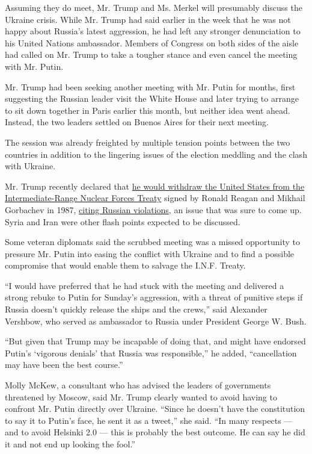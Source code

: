 Assuming they do meet, Mr. Trump and Ms. Merkel will presumably discuss
the Ukraine crisis. While Mr. Trump had said earlier in the week that he
was not happy about Russia's latest aggression, he had left any stronger
denunciation to his United Nations ambassador. Members of Congress on
both sides of the aisle had called on Mr. Trump to take a tougher stance
and even cancel the meeting with Mr. Putin.

Mr. Trump had been seeking another meeting with Mr. Putin for months,
first suggesting the Russian leader visit the White House and later
trying to arrange to sit down together in Paris earlier this month, but
neither idea went ahead. Instead, the two leaders settled on Buenos
Aires for their next meeting.

The session was already freighted by multiple tension points between the
two countries in addition to the lingering issues of the election
meddling and the clash with Ukraine.

Mr. Trump recently declared that
\href{https://www.nytimes3xbfgragh.onion/2018/10/19/us/politics/russia-nuclear-arms-treaty-trump-administration.html}{he
would withdraw the United States from the Intermediate-Range Nuclear
Forces Treaty} signed by Ronald Reagan and Mikhail Gorbachev in 1987,
\href{https://www.nytimes3xbfgragh.onion/2018/10/23/world/europe/inf-treaty-russia-united-states-trump-nuclear.html}{citing
Russian violations}, an issue that was sure to come up. Syria and Iran
were other flash points expected to be discussed.

Some veteran diplomats said the scrubbed meeting was a missed
opportunity to pressure Mr. Putin into easing the conflict with Ukraine
and to find a possible compromise that would enable them to salvage the
I.N.F. Treaty.

``I would have preferred that he had stuck with the meeting and
delivered a strong rebuke to Putin for Sunday's aggression, with a
threat of punitive steps if Russia doesn't quickly release the ships and
the crews,'' said Alexander Vershbow, who served as ambassador to Russia
under President George W. Bush.

``But given that Trump may be incapable of doing that, and might have
endorsed Putin's `vigorous denials' that Russia was responsible,'' he
added, ``cancellation may have been the best course.''

Molly McKew, a consultant who has advised the leaders of governments
threatened by Moscow, said Mr. Trump clearly wanted to avoid having to
confront Mr. Putin directly over Ukraine. ``Since he doesn't have the
constitution to say it to Putin's face, he sent it as a tweet,'' she
said. ``In many respects --- and to avoid Helsinki 2.0 --- this is
probably the best outcome. He can say he did it and not end up looking
the fool.''

